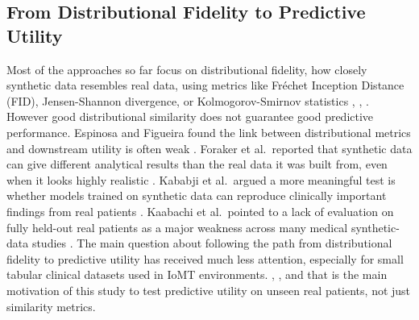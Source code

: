 \documentclass[journal]{IEEEtran}
\begin{document}
%
%

\subsection{From Distributional Fidelity to Predictive Utility}

Most of the approaches so far focus on distributional fidelity, how closely synthetic data resembles real data, using metrics like Fr\'{e}chet Inception Distance (FID), Jensen-Shannon divergence, or Kolmogorov-Smirnov statistics \cite{yan2022}, \cite{figueira2022}, \cite{dankar2022}. However good distributional similarity does not guarantee good predictive performance. Espinosa and Figueira found the link between distributional metrics and downstream utility is often weak \cite{espinosa2023}. Foraker et al.\ reported that synthetic data can give different analytical results than the real data it was built from, even when it looks highly realistic \cite{foraker2020}. Kababji et al.\ argued a more meaningful test is whether models trained on synthetic data can reproduce clinically important findings from real patients \cite{kababji2023}. Kaabachi et al.\ pointed to a lack of evaluation on fully held-out real patients as a major weakness across many medical synthetic-data studies \cite{kaabachi2023}. The main question about following the path from distributional fidelity to predictive utility has received much less attention, especially for small tabular clinical datasets used in IoMT environments. \cite{kababji2023}, \cite{espinosa2023}, and that is the main motivation of this study to test predictive utility on unseen real patients, not just similarity metrics.
\end{document}
